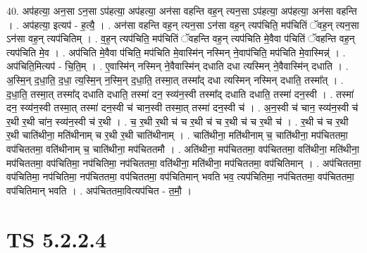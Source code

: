 \documentclass[17pt]{extarticle}
\begin{document}
40. अप॑हत्या॒ अन॒सा ऽन॒सा ऽप॑हत्या॒ अप॑हत्या॒ अन॑सा वहन्ति वह॒न् त्यन॒सा ऽप॑हत्या॒ अप॑हत्या॒ अन॑सा वहन्ति । . अप॑हत्या॒ इत्यप॑ - ह॒त्यै॒ । . अन॑सा वहन्ति वह॒न् त्यन॒सा ऽन॑सा वह॒न् त्यप॑चिति॒ मप॑चितिं ॅवह॒न् त्यन॒सा ऽन॑सा वह॒न् त्यप॑चितिम् । . व॒ह॒न् त्यप॑चिति॒ मप॑चितिं ॅवहन्ति वह॒न् त्यप॑चिति मे॒वैवा प॑चितिं ॅवहन्ति वह॒न् त्यप॑चिति मे॒व । . अप॑चिति मे॒वैवा प॑चिति॒ मप॑चिति मे॒वास्मि॑न् नस्मिन् ने॒वाप॑चिति॒ मप॑चिति मे॒वास्मिन्न्॑ । . अप॑चिति॒मित्यप॑ - चि॒ति॒म् । . ए॒वास्मि॑न् नस्मिन् ने॒वैवास्मि॑न् दधाति दधा त्यस्मिन् ने॒वैवास्मि॑न् दधाति । . अ॒स्मि॒न् द॒धा॒ति॒ द॒धा॒ त्य॒स्मि॒न् न॒स्मि॒न् द॒धा॒ति॒ तस्मा॒त् तस्मा᳚द् दधा त्यस्मिन् नस्मिन् दधाति॒ तस्मा᳚त् । . द॒धा॒ति॒ तस्मा॒त् तस्मा᳚द् दधाति दधाति॒ तस्मा॑ दन॒ स्व्य॑न॒स्वी तस्मा᳚द् दधाति दधाति॒ तस्मा॑ दन॒स्वी । . तस्मा॑ दन॒ स्व्य॑न॒स्वी तस्मा॒त् तस्मा॑ दन॒स्वी च॑ चान॒स्वी तस्मा॒त् तस्मा॑ दन॒स्वी च॑ । . अ॒न॒स्वी च॑ चान॒ स्व्य॑न॒स्वी च॑ र॒थी र॒थी चा॑न॒ स्व्य॑न॒स्वी च॑ र॒थी । . च॒ र॒थी र॒थी च॑ च र॒थी च॑ च र॒थी च॑ च र॒थी च॑ । . र॒थी च॑ च र॒थी र॒थी चाति॑थीना॒ मति॑थीनाम् च र॒थी र॒थी चाति॑थीनाम् । . चाति॑थीना॒ मति॑थीनाम् च॒ चाति॑थीना॒ मप॑चिततमा॒ वप॑चिततमा॒ वति॑थीनाम् च॒ चाति॑थीना॒ मप॑चिततमौ । . अति॑थीना॒ मप॑चिततमा॒ वप॑चिततमा॒ वति॑थीना॒ मति॑थीना॒ मप॑चिततमा॒ वप॑चितिमा॒ नप॑चितिमा॒ नप॑चिततमा॒ वति॑थीना॒ मति॑थीना॒ मप॑चिततमा॒ वप॑चितिमान् । . अप॑चिततमा॒ वप॑चितिमा॒ नप॑चितिमा॒ नप॑चिततमा॒ वप॑चिततमा॒ वप॑चितिमान् भवति भव॒ त्यप॑चितिमा॒ नप॑चिततमा॒ वप॑चिततमा॒ वप॑चितिमान् भवति । . अप॑चिततमा॒वित्यप॑चित - त॒मौ॒ । \newline
\pagebreak
{}

\section{ TS 5.2.2.4 }
\end{document}
